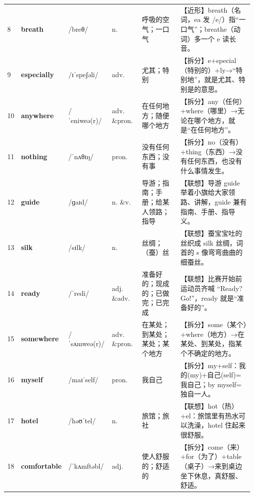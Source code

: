 \documentclass[UTF8,a4paper,11pt,oneside]{ctexbook}
\newcommand{\cellword}[1]{{\bfseries\textcolor{wordcol}{#1}}}
\newcommand{\cellipa}[1]{{\footnotesize\textcolor{ipacol}{#1}}}
\newcommand{\cellpos}[1]{\textcolor{poscol}{#1}}
\newcommand{\cellno}[1]{\textcolor{volcolor!75!black}{#1}}
\begin{document}
{\begin{longtable}{@{}C{0.045\textwidth}L{0.155\textwidth}L{0.175\textwidth}C{0.070\textwidth}L{0.180\textwidth}L{0.282\textwidth}@{}}
\cellno{8} & \cellword{breath} & \cellipa{/breθ/} & \cellpos{n.} & 呼吸的空气；一口气 & \textcolor{tagNear}{【近形】}breath（名词，ea 发 /e/）指“一口气”；breathe（动词）多一个 e 读长音。 \\
 \cellno{9} & \cellword{especially} & \cellipa{/ɪˈspeʃəli/} & \cellpos{adv.} & 尤其；特别 & \textcolor{tagSplit}{【拆分】}e+special（特别的）+ly→\allowbreak{}“特别地”，就是尤其、特别是的意思。 \\
\cellno{10} & \cellword{anywhere} & \cellipa{/ˈeniweə(r)/} & \cellpos{adv. \&pron.} & 在任何地方；随便哪个地方 & \textcolor{tagSplit}{【拆分】}any（任何）+where（哪里）→\allowbreak{}无论在哪个地方，就是“在任何地方”。 \\
 \cellno{11} & \cellword{nothing} & \cellipa{/ˈnʌθɪŋ/} & \cellpos{pron.} & 没有任何东西；没有事 & \textcolor{tagSplit}{【拆分】}no（没有）+thing（东西）→\allowbreak{}没有任何东西，也没有什么事情发生。 \\
\cellno{12} & \cellword{guide} & \cellipa{/ɡaɪd/} & \cellpos{n. \&v.} & 导游；指南；手册；给某人领路；指导 & \textcolor{tagAssoc}{【联想】}导游 guide 举着小旗给大家领路、讲解，guide 兼有指南、手册、指导义。 \\
 \cellno{13} & \cellword{silk} & \cellipa{/sɪlk/} & \cellpos{n.} & 丝绸；（蚕）丝 & \textcolor{tagAssoc}{【联想】}蚕宝宝吐的丝织成 silk 丝绸，词首的 s 像弯弯曲曲的细蚕丝。 \\
\cellno{14} & \cellword{ready} & \cellipa{/ˈredi/} & \cellpos{adj. \&adv.} & 准备好的；现成的；已做完；已完成 & \textcolor{tagAssoc}{【联想】}比赛开始前运动员齐喊 “Ready? Go!”，ready 就是“准备好的”。 \\
 \cellno{15} & \cellword{somewhere} & \cellipa{/ˈsʌmweə(r)/} & \cellpos{adv. \&pron.} & 在某处；到某处；某处；某个地方 & \textcolor{tagSplit}{【拆分】}some（某个）+where（地方）→\allowbreak{}在某处、到某处，指某个不确定的地方。 \\
\cellno{16} & \cellword{myself} & \cellipa{/maɪˈself/} & \cellpos{pron.} & 我自己 & \textcolor{tagSplit}{【拆分】}my+self：我的(my)+自己(self)=我自己；by myself=独自一人。 \\
 \cellno{17} & \cellword{hotel} & \cellipa{/həʊˈtel/} & \cellpos{n.} & 旅馆；旅社 & \textcolor{tagAssoc}{【联想】}hot（热）+el：旅馆里有热水可以洗澡，hotel 住起来很舒服。 \\
\cellno{18} & \cellword{comfortable} & \cellipa{/ˈkʌmftəbl/} & \cellpos{adj.} & 使人舒服的；舒适的 & \textcolor{tagSplit}{【拆分】}come（来）+for（为了）+table（桌子）→\allowbreak{}来到桌边坐下休息，真舒服、舒适。 \\

\end{longtable}}
\end{document}
